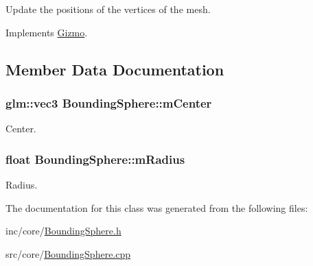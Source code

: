 Update the positions of the vertices of the mesh. 



Implements \hyperlink{class_gizmo_a30161525d80402eb0653f2612003a733}{Gizmo}.



\subsection{Member Data Documentation}
\hypertarget{class_bounding_sphere_a9975e7a417553c4f425e050f198122a1}{
\subsubsection[{m\+Center}]{\setlength{\rightskip}{0pt plus 5cm}glm\+::vec3 Bounding\+Sphere\+::m\+Center\hspace{0.3cm}{\ttfamily [protected]}}}\label{class_bounding_sphere_a9975e7a417553c4f425e050f198122a1}


Center. 

\hypertarget{class_bounding_sphere_a305aa1ba8daf58a8834547d4e0c15e7b}{
\subsubsection[{m\+Radius}]{\setlength{\rightskip}{0pt plus 5cm}float Bounding\+Sphere\+::m\+Radius\hspace{0.3cm}{\ttfamily [protected]}}}\label{class_bounding_sphere_a305aa1ba8daf58a8834547d4e0c15e7b}


Radius. 



The documentation for this class was generated from the following files\+:\begin{DoxyCompactItemize}
\item 
inc/core/\hyperlink{_bounding_sphere_8h}{Bounding\+Sphere.\+h}\item 
src/core/\hyperlink{_bounding_sphere_8cpp}{Bounding\+Sphere.\+cpp}\end{DoxyCompactItemize}
